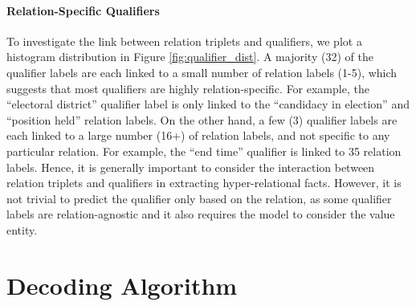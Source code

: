 \documentclass[11pt]{article}
\begin{document}
\paragraph{Relation-Specific Qualifiers}
To investigate the link between relation triplets and qualifiers, we plot a histogram distribution in Figure \ref{fig:qualifier_dist}.
A majority (32) of the qualifier labels are each linked to a small number of relation labels (1-5), which suggests that most qualifiers are highly relation-specific.
For example, the ``electoral district'' qualifier label is only linked to the ``candidacy in election'' and ``position held'' relation labels.
On the other hand, a few (3) qualifier labels are each linked to a large number (16+) of relation labels, and not specific to any particular relation.
For example, the ``end time'' qualifier is linked to 35 relation labels.
Hence, it is generally important to consider the interaction between relation triplets and qualifiers in extracting hyper-relational facts.
However, it is not trivial to predict the qualifier only based on the relation, as some qualifier labels are relation-agnostic and it also requires the model to consider the value entity.

\section{Decoding Algorithm}
\label{sec:decode_algo}
\end{document}
